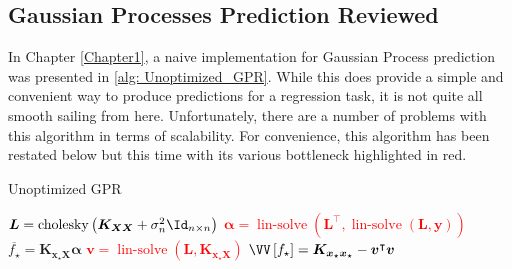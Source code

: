 \subsection{Gaussian Processes Prediction Reviewed}\label{Section5.1}

In Chapter \ref{Chapter1}, a naive implementation for Gaussian Process prediction was presented in \cref{alg: Unoptimized_GPR}. While this does provide a simple and convenient way to produce predictions for a regression task, it is not quite all smooth sailing from here. Unfortunately, there are a number of problems with this algorithm in terms of scalability. For convenience, this algorithm has been restated below but this time with its various bottleneck highlighted in red.

\setcounter{savecounter}{\value{algocf}}
\setcounter{algocf}{\value{GPRcount}}

{\centering
    \begin{minipage}{.85\linewidth}

        \begin{algorithm*}[H]
            \caption{Unoptimized GPR}
            \SetAlgoLined
            \DontPrintSemicolon

            \BlankLine
            \textcolor{red}{$\bm{L} = \operatorname{cholesky} \left( \bm{K_{XX}} + \sigma_n^2 \Id_{n \times n} \right)$}\;
            \textcolor{red}{$\bm{\alpha} = \operatorname{lin-solve} \left( \bm{L}^{\intercal} , \operatorname{lin-solve} \left( \bm{L}, \bm{y} \right) \right)$}\;
            $\overline{f_{\star}} = \bm{K_{x_{\star} X}} \bm{\alpha}$\;
            \textcolor{red}{$\bm{v} = \operatorname{lin-solve} \left( \bm{L}, \bm{K_{x_{\star} X}} \right)$}\;
            $\VV \left[ f_{\star} \right] = \bm{K_{x_{\star} x_{\star}}} - \bm{v}^{\intercal} \bm{v}$\;
            \BlankLine
        \end{algorithm*}
    \end{minipage}
    \par
}

\setcounter{algocf}{\value{savecounter}}

